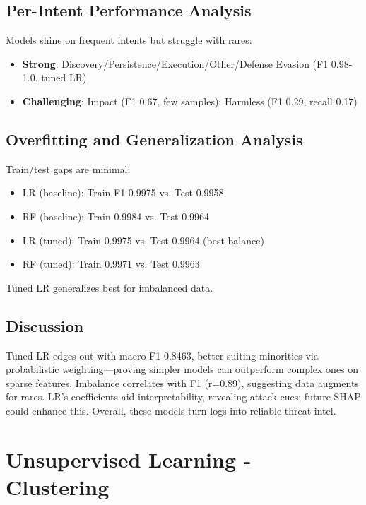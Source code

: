 \documentclass[acmlarge,screen,nonacm]{acmart}
\begin{document}
\FloatBarrier
\subsection{Per-Intent Performance Analysis}

Models shine on frequent intents but struggle with rares:
\begin{itemize}
    \item \textbf{Strong}: Discovery/Persistence/Execution/Other/Defense Evasion (F1 0.98-1.0, tuned LR)
    \item \textbf{Challenging}: Impact (F1 0.67, few samples); Harmless (F1 0.29, recall 0.17)
\end{itemize}

\subsection{Overfitting and Generalization Analysis}

Train/test gaps are minimal:
\begin{itemize}
    \item LR (baseline): Train F1 0.9975 vs. Test 0.9958
    \item RF (baseline): Train 0.9984 vs. Test 0.9964
    \item LR (tuned): Train 0.9975 vs. Test 0.9964 (best balance)
    \item RF (tuned): Train 0.9971 vs. Test 0.9963
\end{itemize}

Tuned LR generalizes best for imbalanced data.

\subsection{Discussion}

Tuned LR edges out with macro F1 0.8463, better suiting minorities via probabilistic weighting—proving simpler models can outperform complex ones on sparse features. Imbalance correlates with F1 (r=0.89), suggesting data augments for rares. LR's coefficients aid interpretability, revealing attack cues; future SHAP could enhance this. Overall, these models turn logs into reliable threat intel.

\section{Unsupervised Learning - Clustering}
\end{document}
